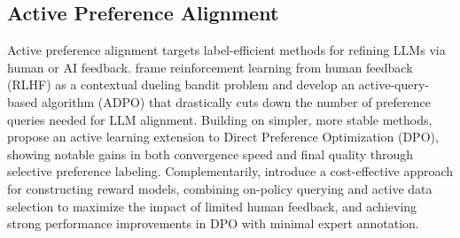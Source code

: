 \subsection{Active Preference Alignment}
Active preference alignment targets label-efficient methods for refining LLMs via human or AI feedback.
\citet{ji2024reinforcement} frame reinforcement learning from human feedback (RLHF) as a contextual dueling bandit problem and develop an active-query-based algorithm (ADPO) that drastically cuts down the number of preference queries needed for LLM alignment.
Building on simpler, more stable methods, \citet{muldrew2024active} propose an active learning extension to Direct Preference Optimization (DPO), showing notable gains in both convergence speed and final quality through selective preference labeling.
Complementarily, \citet{chen2024cost} introduce a cost-effective approach for constructing reward models, combining on-policy querying and active data selection to maximize the impact of limited human feedback, and achieving strong performance improvements in DPO with minimal expert annotation.

% 
%




